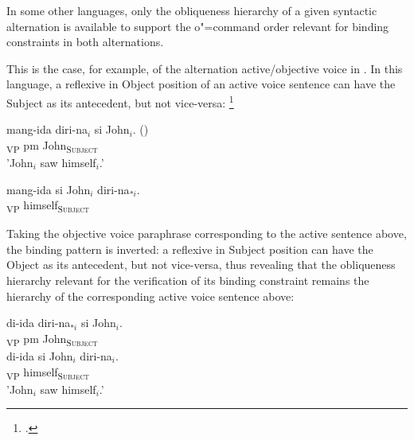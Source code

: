 \documentclass[output=paper
,modfonts
,nonflat]{langsci/langscibook}
\begin{document}
In some other languages, only the obliqueness hierarchy of a given syntactic alternation 
is available to support
the o"=command order relevant for binding constraints in both alternations.

This is the
case, for example, of the alternation active/objective voice in . 
In this language, a reflexive in Object position of an active voice sentence
can have the Subject as its antecedent, but not vice-versa:%
%
\footnote{
\citep[]{manningSag:1999}.}


\begin{exe}
\ex
\begin{xlist}
\ex
\gll mang-ida diri-na$_{i}$ si John$_{i}$. ()\\ 
[{\sc active}-saw himself\textsubscript{\textsc{Object}}]\textsubscript{VP} {\sc pm} John\textsubscript{\textsc{Subject}} \\
\trans 'John$_{i}$ saw himself$_{i}$.'

\ex
\gll mang-ida si John$_{i}$ diri-na$_{*i}$.\\ 
[{\sc active}-saw {\sc pm} John\textsubscript{\textsc{Object}}]\textsubscript{VP} himself\textsubscript{\textsc{Subject}} \\
\end{xlist}
\end{exe}



Taking the objective voice paraphrase corresponding to the active sentence
above, the binding pattern is inverted: a reflexive in Subject position can have
the Object as its antecedent, but not vice-versa, thus revealing that
the obliqueness hierarchy relevant for the verification of its binding
constraint remains the hierarchy of the corresponding active voice
sentence above:

\begin{exe}
\ex
\begin{xlist}
\ex
\gll di-ida diri-na$_{*i}$ si John$_{i}$.\\ 
[{\sc objective}-saw himself\textsubscript{\textsc{Object}}]\textsubscript{VP} {\sc pm} John\textsubscript{\textsc{Subject}} \\

\ex
\gll di-ida si John$_{i}$ diri-na$_{i}$.\\ 
[{\sc objective}-saw {\sc pm} John\textsubscript{\textsc{Object}}]\textsubscript{VP} himself\textsubscript{\textsc{Subject}} \\
\trans 'John$_{i}$ saw himself$_{i}$.'
\end{xlist}
\end{exe}
\end{document}

